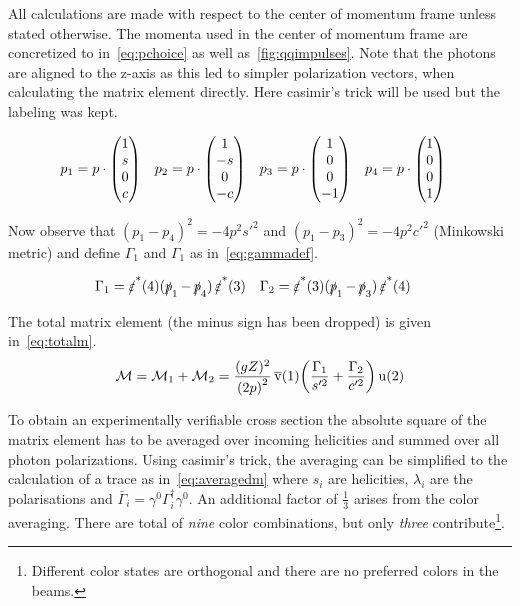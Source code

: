 All calculations are made with respect to the center of momentum frame
unless stated otherwise. The momenta used in the center of momentum
frame are concretized to in~\eqref{eq:pchoice} as well
as~\ref{fig:qqimpulses}.  Note that the photons are aligned to the
z-axis as this led to simpler polarization vectors, when calculating
the matrix element directly. Here casimir's trick will be used but the
labeling was kept.

\begin{align}
  \label{eq:pchoice}
  p_1&=p\cdot\mqty(1 \\ s \\ 0 \\ c)
     & p_2&=p\cdot\mqty(1 \\ -s \\ 0 \\ -c)
     & p_3&=p\cdot\mqty(1 \\ 0 \\ 0 \\ -1)
     & p_4&=p\cdot\mqty(1 \\ 0 \\ 0 \\ 1)
\end{align}

Now observe that \((p_1-p_4)^2=-4p^2s'^2\) and
\((p_1-p_3)^2=-4p^2c'^2\) (Minkowski metric) and define \(\Gamma_1\)
and \(\Gamma_1\) as in~\eqref{eq:gammadef}.

\begin{align}
  \label{eq:gammadef}
  \Gamma_1 &= \pses(4)(\ps_1 - \ps_4)\pses(3) &
  \Gamma_2 &= \pses(3)(\ps_1 - \ps_3)\pses(4)
\end{align}

The total matrix element (the minus sign has been dropped) is given in~\eqref{eq:totalm}.
\begin{equation}
  \label{eq:totalm}
  \mathcal{M} = \mathcal{M}_1 + \mathcal{M}_2 = \frac{(gZ)^2}{\qty(2p)^2}\operatorname*{\overline{v}}(1)\qty(\frac{\Gamma_1}{s'^2}+\frac{\Gamma_2}{c'^2})\operatorname{u}(2)
\end{equation}

To obtain an experimentally verifiable cross section the absolute
square of the matrix element has to be averaged over incoming
helicities and summed over all photon polarizations. Using casimir's
trick, the averaging can be simplified to the calculation of a trace
as in~\ref{eq:averagedm} where \(s_i\) are helicities, \(\lambda_i\)
are the polarisations and
\(\bar{\Gamma}_i=\gamma^0\Gamma^\dagger_i\gamma^0\). An additional
factor of \(\frac{1}{3}\) arises from the color averaging. There are
total of \emph{nine} color combinations, but only \emph{three}
contribute\footnote{Different color states are orthogonal and there
  are no preferred colors in the beams.}.

